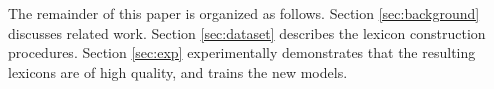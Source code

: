 \documentclass[11pt]{article}
\begin{document}
The remainder of this paper is organized as follows.
Section \ref{sec:background} discusses related work.
Section \ref{sec:dataset} describes the lexicon construction procedures.
Section \ref{sec:exp} experimentally demonstrates that the resulting lexicons are of high quality,
and trains the new models.

\begin{figure}
    \centering
    \small
    \begin{tabular}{p{1.2in}p{1.2in}}
        \toprule

\end{tabular}
\end{figure}
\end{document}
